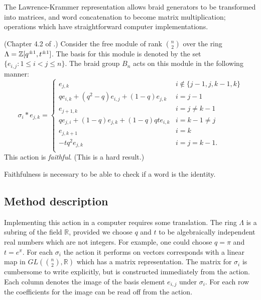 \documentclass[12pt]{thesis}
\begin{document}
The Lawrence-Krammer representation allows braid
generators to be transformed into matrices,
and word concatenation to become matrix multiplication;
operations which have straightforward computer implementations.

\begin{proposition}
    (Chapter 4.2 of \cite{lk-representation}.)
Consider the  free module of rank ${n \choose 2}$
over the ring $\Lambda = \mathbb{Z}[q^{\pm 1}, t^{\pm 1}]$.
The basis for this module is denoted by the set $\{ e_{i, j} \colon 1 \leq i < j \leq n \}$.
The braid group $B_{n}$ acts on this module in the following manner:
\[
    \sigma_{i} * e_{j, k} =
    \begin{cases}
        e_{j, k} & i \not\in \{ j -1, j, k -1, k \} \\
        qe_{i, k} + (q^{2} - q)e_{i, j} + (1-q)e_{j, k} & i = j -1 \\
        e_{j + 1, k} & i = j \neq k -1 \\
        qe_{j, i} + (1 - q) e_{j, k} + (1 - q)qte_{i, k} & i = k - 1 \neq j \\
        e_{j, k +1} & i = k \\
        -tq^{2} e_{j, k} & i = j = k - 1. \\
    \end{cases}
\]
This action is \textit{faithful}. (This is a hard result.)
\end{proposition}

Faithfulness is necessary to be able
to check if a word is the identity.

\subsection{Method description}

Implementing this action in a computer requires some translation.
The ring $\Lambda$ is a subring of the field $\mathbb{R}$,
provided we choose $q$ and $t$ to be algebraically independent
real numbers which are not integers.
For example, one could choose $q = \pi$ and $t = e^{\pi}$.
For each $\sigma_{i}$ the action it performs on vectors corresponds with a linear map
in $GL({ n \choose 2}, \mathbb{R})$ which has a matrix representation.
The matrix for $\sigma_{i}$ is cumbersome to write explicitly, but is
constructed immediately from the action.
Each column denotes the image of the basis element $e_{i, j}$ under $\sigma_{i}$.
For each row the coefficients for the image
can be read off from the action.
\end{document}
